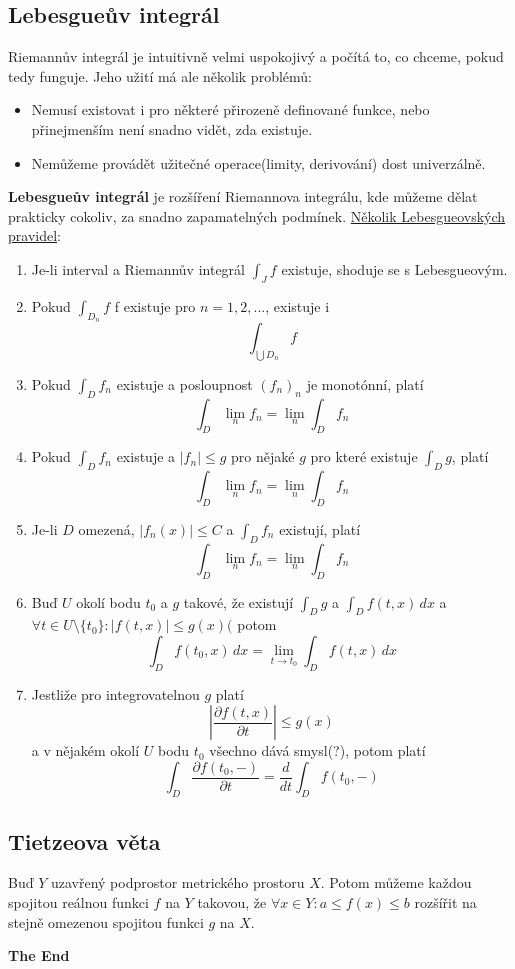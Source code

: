 \documentclass[10pt]{article}
\begin{document}
\subsection{Lebesgueův integrál}
\hspace{1.2mm}
Riemannův integrál je intuitivně velmi uspokojivý a počítá to, co chceme, pokud tedy funguje.
Jeho užití má ale několik problémů:
\begin{itemize}
    \item Nemusí existovat i pro některé přirozeně definované funkce, nebo
    přinejmenším není snadno vidět, zda existuje.
    \item Nemůžeme provádět užitečné operace(limity, derivování) dost univerzálně.
\end{itemize}
\textbf{Lebesgueův integrál} je rozšíření Riemannova integrálu, kde můžeme dělat prakticky cokoliv,
za snadno zapamatelných podmínek.
\underline{Několik Lebesgueovských pravidel}:
\begin{enumerate}
    \item Je-li interval a Riemannův integrál $\int_{J} f$ existuje, shoduje se s Lebesgueovým.
    \item Pokud $ \int_{D_n} f $ f existuje pro $n = 1, 2, ...$, existuje i \[\int_{\bigcup D_n} f\]
    \item Pokud $ \int_{D} f_n $ existuje a posloupnost $(f_n)_n$ je monotónní, platí
    \[ \int_D \lim_n f_n = \lim_n \int_D f_n \]
    \item Pokud $\int_D f_n$ existuje a $|f_n|\leq g$ pro nějaké $g$ pro které existuje
    $\int_D g$, platí
    \[ \int_D \lim_n f_n = \lim_n \int_D f_n \]
    \item Je-li $D$ omezená, $|f_n(x)| \leq C$ a $\int_D f_n$ existují, platí
    \[ \int_D \lim_n f_n = \lim_n \int_D f_n \]
    \item Buď $U$ okolí bodu $t_0$ a $g$ takové, že existují $\int_D g$ a $\int_D f(t,x)\,dx$ a
    $\forall t \in U\textrm{\textbackslash}\{t_0\}: |f(t,x)|\leq g(x)($ potom
    \[ \int_D f(t_0, x)\,dx = \lim_{t\to t_0} \int_D f(t,x)\,dx \]
    \item Jestliže pro integrovatelnou $g$ platí
    \[ \left| \frac{\partial f(t,x)}{\partial t} \right| \leq g(x) \]
    a v nějakém okolí $U$ bodu $t_0$ všechno dává smysl(?), potom platí
    \[ \int_D \frac{\partial f(t_0,-)}{\partial t} = \frac{d}{dt} \int_D f(t_0, -)\]
\end{enumerate}


\subsection{Tietzeova věta}
\hspace{1.2mm}
Buď $Y$ uzavřený podprostor metrického prostoru $X$. Potom můžeme každou spojitou reálnou
funkci $f$ na $Y$ takovou, že $\forall x \in Y: a \leq f(x) \leq b$ rozšířit na stejně omezenou
spojitou funkci $g$ na $X$.

\vfill
\begin{center}
\LARGE
\textbf{The End}
\end{center}
\end{document}
